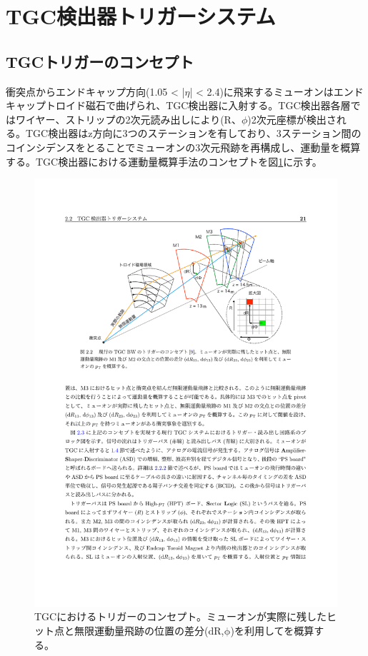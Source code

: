 \section{TGC検出器トリガーシステム}
\label{sec_TGCtrigger}

    \subsection{TGCトリガーのコンセプト}

衝突点からエンドキャップ方向(1.05 < |$\eta$| < 2.4)に飛来するミューオンはエンドキャップトロイド磁石で曲げられ、TGC検出器に入射する。TGC検出器各層ではワイヤー、ストリップの2次元読み出しにより(R、$\phi$)2次元座標が検出される。TGC検出器はz方向に3つのステーションを有しており、3ステーション間のコインシデンスをとることでミューオンの3次元飛跡を再構成し、運動量を概算する。TGC検出器における運動量概算手法のコンセプトを図\ref{TGC_triggerconcept}に示す。

\begin{figure} 
\centering
\includegraphics[width=16cm]{fig/Intro/TGC_triggerconcept.pdf}
\caption[TGCにおけるトリガーのコンセプト]{TGCにおけるトリガーのコンセプト\cite{mt_akatsuka}。ミューオンが実際に残したヒット点と無限運動量飛跡の位置の差分($\mathrm{dR}$,$\mathrm{\phi}$)を利用して\pt を概算する。}
\label{TGC_triggerconcept}
\end{figure}

